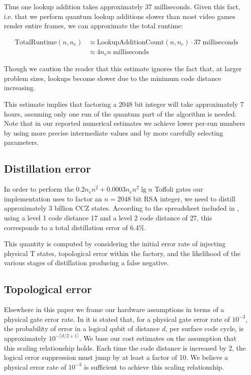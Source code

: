 \documentclass[superscriptaddress,notitlepage,longbibliography]{revtex4-1}
\theoremstyle{definition}
\theoremstyle{definition}
\newcommand{\lenexp}{{n_e}}
\begin{document}
Thus one lookup addition takes approximately 37 milliseconds.
Given this fact, i.e. that we perform quantum lookup additions slower than most video games render entire frames, we can approximate the total runtime:

\begin{equation}
\begin{aligned}
    \text{TotalRuntime}(n, \lenexp)
    &\approx \text{LookupAdditionCount}(n, \lenexp) \cdot 37 \;\text{milliseconds}
    \\&\approx 4 \lenexp n \;\text{milliseconds}
\end{aligned}
\end{equation}

Though we caution the reader that this estimate ignores the fact that, at larger problem sizes, lookups become slower due to the minimum code distance increasing.

This estimate implies that factoring a 2048 bit integer will take approximately 7 hours, assuming only one run of the quantum part of the algorithm is needed.
Note that in our reported numerical estimates we achieve lower per-run numbers by using more precise intermediate values and by more carefully selecting parameters.


\subsection{Distillation error}

In order to perform the $0.2 \lenexp n^2 + 0.0003 \lenexp n^2 \lg n$ Toffoli gates our implementation uses to factor an $n=2048$ bit RSA integer, we need to distill approximately 3 billion CCZ states.
According to the spreadsheet included in \cite{gidney2018magic}, using a level 1 code distance 17 and a level 2 code distance of 27, this corresponds to a total distillation error of 6.4\%.

This quantity is computed by considering the initial error rate of injecting physical T states, topological error within the factory, and the likelihood of the various stages of distillation producing a false negative.

\subsection{Topological error}

Elsewhere in this paper we frame our hardware assumptions in terms of a physical gate error rate.
In \cite{fowler2013surfaceblock} it is stated that, for a physical gate error rate of $10^{-3}$, the probability of error in a logical qubit of distance $d$, per surface code cycle, is approximately $10^{-\lceil d/2+1 \rceil}$.
We base our cost estimates on the assumption that this scaling relationship holds.
Each time the code distance is increased by 2, the logical error suppression must jump by at least a factor of 10.
We believe a physical error rate of $10^{-3}$ is sufficient to achieve this scaling relationship.
\end{document}
